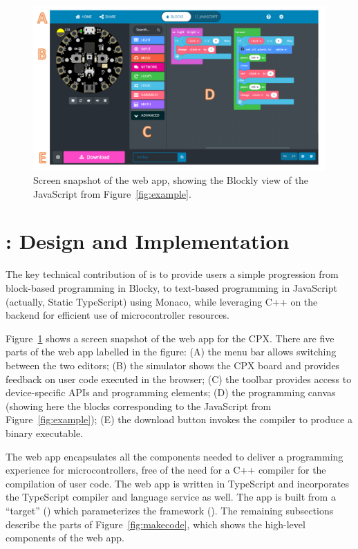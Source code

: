 
\begin{figure}[t]
    \includegraphics[width=6in]{CPXfig.pdf}
\caption{\label{fig:screenSnap}Screen snapshot of the \MC web app, showing the Blockly
view of the JavaScript from Figure~\ref{fig:example}.}
\end{figure}


\section{\MCN: Design and Implementation}
\label{sec:makecode}

The key technical contribution of \MC is to provide users a simple progression from block-based
programming in Blocky, to text-based programming in JavaScript (actually, Static TypeScript) 
using Monaco, while leveraging C++ on the backend for efficient use of microcontroller resources.

Figure~\ref{fig:screenSnap} shows a screen snapshot of the \MC web app for the CPX.
There are five parts of the web app labelled in the figure:
(A) the menu bar allows switching between the two editors;
(B) the simulator shows the CPX board and provides feedback on user code executed in the browser;
(C) the toolbar provides access to device-specific APIs and programming elements;
(D) the programming canvas (showing here the blocks corresponding to the JavaScript from Figure~\ref{fig:example});
(E) the download button invokes the compiler to produce a binary executable.

The \MC web app encapsulates all the components needed to deliver a programming experience
for microcontrollers, free of the need for a C++ compiler for the compilation of user code.
The web app is written in TypeScript and incorporates the TypeScript compiler and
language service as well.
The app is built from a \MC ``target'' (\emph{})
which parameterizes the \MC framework (\emph{}).
The remaining subsections describe the parts of Figure~\ref{fig:makecode}, 
which shows the high-level components of the web app.

